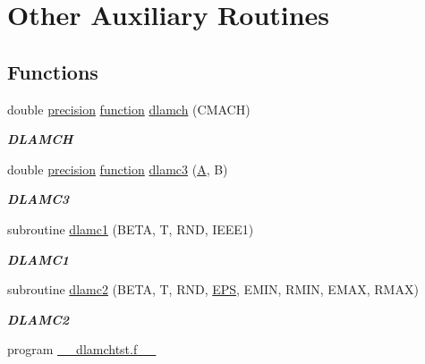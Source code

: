 \hypertarget{group__auxOTHERauxiliary}{}\section{Other Auxiliary Routines}
\label{group__auxOTHERauxiliary}
\subsection*{Functions}
\begin{DoxyCompactItemize}
\item 
double \hyperlink{numinquire_8h_a2c8e616467665d0b2814d4c1589ba74e}{precision} \hyperlink{afunc_8m_a7b5e596df91eadea6c537c0825e894a7}{function} \hyperlink{group__auxOTHERauxiliary_ga06d6aa332f6f66e062e9b96a41f40800}{dlamch} (C\+M\+A\+C\+H)
\begin{DoxyCompactList}\small\item\em {\bfseries D\+L\+A\+M\+C\+H} \end{DoxyCompactList}\item 
double \hyperlink{numinquire_8h_a2c8e616467665d0b2814d4c1589ba74e}{precision} \hyperlink{afunc_8m_a7b5e596df91eadea6c537c0825e894a7}{function} \hyperlink{group__auxOTHERauxiliary_gae762ae5fb996f7b2970c522d10fa22f2}{dlamc3} (\hyperlink{classA}{A}, B)
\begin{DoxyCompactList}\small\item\em {\bfseries D\+L\+A\+M\+C3} \end{DoxyCompactList}\item 
subroutine \hyperlink{group__auxOTHERauxiliary_ga48732e43b3051e58aee28857c75ce270}{dlamc1} (B\+E\+T\+A, T, R\+N\+D, I\+E\+E\+E1)
\begin{DoxyCompactList}\small\item\em {\bfseries D\+L\+A\+M\+C1} \end{DoxyCompactList}\item 
subroutine \hyperlink{group__auxOTHERauxiliary_ga0dce45f915606712ff791e280ddad827}{dlamc2} (B\+E\+T\+A, T, R\+N\+D, \hyperlink{tukey_8c_a6ebf6899d6c1c8b7b9d09be872c05aae}{E\+P\+S}, E\+M\+I\+N, R\+M\+I\+N, E\+M\+A\+X, R\+M\+A\+X)
\begin{DoxyCompactList}\small\item\em {\bfseries D\+L\+A\+M\+C2} \end{DoxyCompactList}\item 
program \hyperlink{group__auxOTHERauxiliary_gafdbf236050aae6e38c07d118c3611f96}{\+\_\+\+\_\+dlamchtst.\+f\+\_\+\+\_\+}

\end{DoxyCompactItemize}
